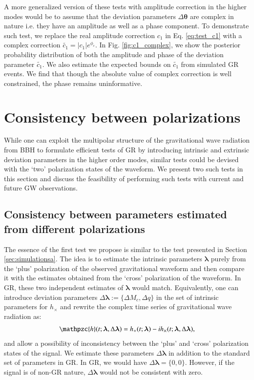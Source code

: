 \documentclass[prd,preprintnumbers,twocolumn,eqsecnum,floatfix,a4paper,nofootinbib,superscriptaddress]{revtex4}
\newcommand{\h}{\mathpzc{h}}
\newcommand{\blambda}{\bm{\lambda}}
\newcommand{\btheta}{\bm{\theta}}
\begin{document}
A more generalized version of these tests with amplitude correction in the higher modes would be to assume that the deviation parameters $\Delta \btheta$ are complex in nature i.e. they have an amplitude as well as a phase component. To demonstrate such test, we replace the real amplitude correction $c_1$ in Eq. \ref{eq:test_c1} with a complex correction $\tilde{c_1}=|c_1|e^{\phi_c}$. In Fig. \ref{fig:c1_complex}, we show the posterior probability distribution of both the amplitude and phase of the deviation parameter $\tilde{c_1}$. We also estimate the expected bounds on $\tilde{c_1}$ from simulated GR events. We find that though the absolute value of complex correction is well constrained, the phase remains uninformative. 




\section{Consistency between polarizations}
\label{sec4}
While one can exploit the multipolar structure of the gravitational wave radiation from BBH to formulate efficient tests of GR by introducing intrinsic and extrinsic deviation parameters in the higher order modes, similar tests could be devised with the `two' polarization states of the waveform. We present two such tests in this section and discuss the feasibility of performing such tests with current and future GW observations.
 
\subsection{Consistency between parameters estimated from different polarizations}
\label{sec4a}
The essence of the first test we propose is similar to the test presented in Section \ref{sec:simulationsa}. The idea is to estimate the intrinsic parameters $\blambda$ purely from the `plus' polarization of the observed gravitational waveform and then compare it with the estimates obtained from the `cross' polarization of the waveform. In GR, these two independent estimates of $\blambda$ would match. Equivalently, one can introduce deviation parameters $\Delta \blambda := \{\Delta M_c, \Delta q\}$ in the set of intrinsic parameters for $h_\times$ and rewrite the complex time series of gravitational wave radiation as:
\begin{eqnarray} 
\h(t; \blambda, \Delta \blambda) =  h_+(t; \blambda) - ih_\times(t; \blambda, \Delta \blambda),
\label{eq:test_hp_hc}
\end{eqnarray}
and allow a possibility of inconsistency between the `plus' and `cross' polarization states of the signal. We estimate these parameters $\Delta \blambda$ in addition to the standard set of parameters in GR. In GR, we would have $\Delta \blambda = \{0,0\}$. However, if the signal is of non-GR nature, $\Delta \blambda$ would not be consistent with zero.
\end{document}
